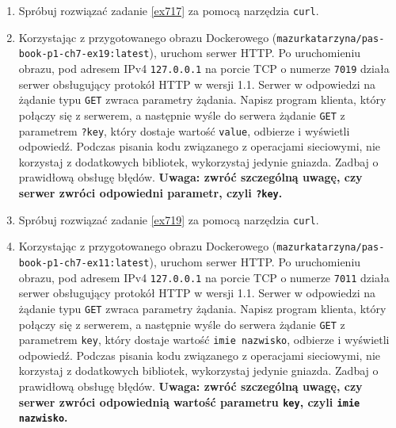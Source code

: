 \documentclass{article}
\begin{document}
\begin{enumerate}[label=\textbf{7.\arabic*}]
\item Spróbuj rozwiązać zadanie \ref{ex717} za pomocą narzędzia \texttt{curl}.  
\item \label{ex719} Korzystając z przygotowanego obrazu Dockerowego (\texttt{mazurkatarzyna/pas-book-p1-ch7-ex19:latest}), uruchom serwer HTTP.  Po uruchomieniu obrazu, pod adresem IPv4 \texttt{127.0.0.1} na porcie TCP o numerze \texttt{7019} działa serwer obsługujący protokół HTTP w wersji 1.1. Serwer w odpowiedzi na żądanie typu \texttt{GET} zwraca parametry żądania. Napisz program klienta, który połączy się z serwerem, a następnie wyśle do serwera żądanie \texttt{GET} z parametrem \texttt{?key}, który dostaje wartość \texttt{value}, odbierze i wyświetli odpowiedź. Podczas pisania kodu związanego z operacjami sieciowymi, nie korzystaj z dodatkowych bibliotek, wykorzystaj jedynie gniazda. Zadbaj o prawidłową obsługę błędów. \textbf{Uwaga: zwróć szczególną uwagę, czy serwer zwróci odpowiedni parametr, czyli \texttt{?key}.} \
\item Spróbuj rozwiązać zadanie \ref{ex719} za pomocą narzędzia \texttt{curl}.  
\newpage 
\item \label{ex721} Korzystając z przygotowanego obrazu Dockerowego (\texttt{mazurkatarzyna/pas-book-p1-ch7-ex11:latest}), uruchom serwer HTTP.  Po uruchomieniu obrazu, pod adresem IPv4 \texttt{127.0.0.1} na porcie TCP o numerze \texttt{7011} działa serwer obsługujący protokół HTTP w wersji 1.1. Serwer w odpowiedzi na żądanie typu \texttt{GET} zwraca parametry żądania. Napisz program klienta, który połączy się z serwerem, a następnie wyśle do serwera żądanie \texttt{GET} z parametrem \texttt{key}, który dostaje wartość \texttt{imie nazwisko}, odbierze i wyświetli odpowiedź. Podczas pisania kodu związanego z operacjami sieciowymi, nie korzystaj z dodatkowych bibliotek, wykorzystaj jedynie gniazda. Zadbaj o prawidłową obsługę błędów. \textbf{Uwaga: zwróć szczególną uwagę, czy serwer zwróci odpowiednią wartość parametru \texttt{key}, czyli \texttt{imie nazwisko}.} \

\end{enumerate}
\end{document}
